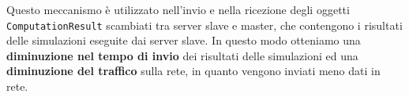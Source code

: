 Questo meccanismo è utilizzato nell'invio e nella ricezione degli oggetti \texttt{ComputationResult} scambiati tra server slave e master, che contengono i risultati delle simulazioni eseguite dai server slave. In questo modo otteniamo una \textbf{diminuzione nel tempo di invio} dei risultati delle simulazioni ed una \textbf{diminuzione del traffico} sulla rete, in quanto vengono inviati meno dati in rete.